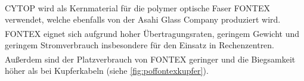 CYTOP\textsuperscript{\texttrademark} wird als Kernmaterial für die polymer
optische Faser FONTEX\textsuperscript{\texttrademark} verwendet, welche
ebenfalls von der Asahi Glass Company produziert wird.
FONTEX\textsuperscript{\texttrademark} eignet sich aufgrund hoher
Übertragungsraten, geringem Gewicht und geringem Stromverbrauch insbesondere für
den Einsatz in Rechenzentren. Außerdem sind der Platzverbrauch von
FONTEX\textsuperscript{\texttrademark} geringer und die Biegsamkeit höher als
bei Kupferkabeln (siehe \autoref{fig:poffontexkupfer}). \cite{poffontex}
